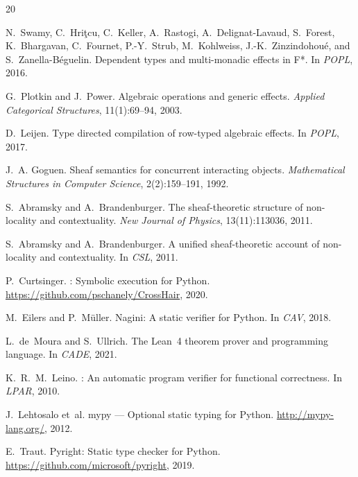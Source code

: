 \documentclass[11pt]{article}
\begin{document}

\begin{thebibliography}{20}

N.~Swamy, C.~Hri\c{t}cu, C.~Keller, A.~Rastogi, A.~Delignat-Lavaud,
S.~Forest, K.~Bhargavan, C.~Fournet, P.-Y.~Strub, M.~Kohlweiss,
J.-K.~Zinzindohou\'e, and S.~Zanella-B\'eguelin.
\newblock Dependent types and multi-monadic effects in {F*}.
\newblock In \emph{POPL}, 2016.

G.~Plotkin and J.~Power.
\newblock Algebraic operations and generic effects.
\newblock \emph{Applied Categorical Structures}, 11(1):69--94, 2003.

D.~Leijen.
\newblock Type directed compilation of row-typed algebraic effects.
\newblock In \emph{POPL}, 2017.

J.~A. Goguen.
\newblock Sheaf semantics for concurrent interacting objects.
\newblock \emph{Mathematical Structures in Computer Science},
2(2):159--191, 1992.

S.~Abramsky and A.~Brandenburger.
\newblock The sheaf-theoretic structure of non-locality and
contextuality.
\newblock \emph{New Journal of Physics}, 13(11):113036, 2011.

S.~Abramsky and A.~Brandenburger.
\newblock A unified sheaf-theoretic account of non-locality and
contextuality.
\newblock In \emph{CSL}, 2011.

P.~Curtsinger.
: Symbolic execution for {Python}.
\newblock \url{https://github.com/pschanely/CrossHair}, 2020.

M.~Eilers and P.~M\"uller.
\newblock Nagini: A static verifier for {Python}.
\newblock In \emph{CAV}, 2018.

L.~de~Moura and S.~Ullrich.
\newblock The {Lean}~4 theorem prover and programming language.
\newblock In \emph{CADE}, 2021.

K.~R.~M.~Leino.
: An automatic program verifier for functional
correctness.
\newblock In \emph{LPAR}, 2010.

J.~Lehtosalo et~al.
\newblock mypy --- Optional static typing for {Python}.
\newblock \url{http://mypy-lang.org/}, 2012.

E.~Traut.
\newblock Pyright: Static type checker for {Python}.
\newblock \url{https://github.com/microsoft/pyright}, 2019.

\end{thebibliography}
\end{document}
